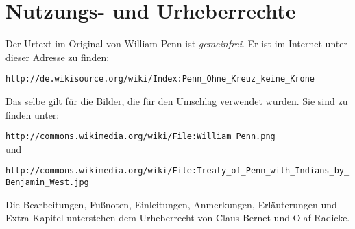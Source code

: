 \chapter{Nutzungs- und Urheberrechte}
Der Urtext im Original von William Penn ist \textit{gemeinfrei}. Er ist im Internet
unter dieser Adresse zu finden:

\begin{center}
\texttt{http://de.wikisource.org/wiki/Index:Penn\_Ohne\_Kreuz\_keine\_Krone}
\end{center}

Das selbe gilt für die Bilder, die für den Umschlag verwendet wurden. Sie sind zu finden unter:

\begin{center}
\texttt{http://commons.wikimedia.org/wiki/File:William\_Penn.png}\\
und\\
\begin{footnotesize}
\texttt{http://commons.wikimedia.org/wiki/File:Treaty\_of\_Penn\_with\_Indians\_by\_Benjamin\_West.jpg}\\
\end{footnotesize}
\end{center}

Die Bearbeitungen, Fußnoten, Einleitungen, Anmerkungen, Erläuterungen und
Extra-Kapitel unterstehen dem Urheberrecht von Claus Bernet und Olaf Radicke.




